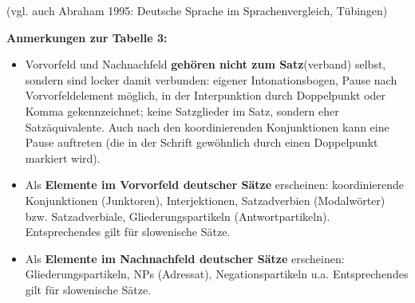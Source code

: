 (vgl. auch Abraham 1995: Deutsche Sprache im Sprachenvergleich,
Tübingen)

\textbf{Anmerkungen zur Tabelle 3:}

\begin{itemize}
\item
  Vorvorfeld und Nachnachfeld \textbf{gehören nicht zum Satz}(verband)
  selbst, sondern sind locker damit verbunden: eigener Intonationsbogen,
  Pause nach Vorvorfeldelement möglich, in der Interpunktion durch
  Doppelpunkt oder Komma gekennzeichnet; keine Satzglieder im Satz,
  sondern eher Satzäquivalente. Auch nach den koordinierenden
  Konjunktionen kann eine Pause auftreten (die in der Schrift gewöhnlich
  durch einen Doppelpunkt markiert wird).
\item
  Als \textbf{Elemente im Vorvorfeld deutscher Sätze} erscheinen:
  koordinierende Konjunktionen (Junktoren), Interjektionen,
  Satzadverbien (Modalwörter) bzw. Satzadverbiale, Gliederungspartikeln
  (Antwortpartikeln). Entsprechendes gilt für slowenische Sätze.
\item
  Als \textbf{Elemente im Nachnachfeld deutscher Sätze} erscheinen:
  Gliederungspartikeln, NPs (Adressat), Negationspartikeln u.a.
  Entsprechendes gilt für slowenische Sätze.
\end{itemize}

